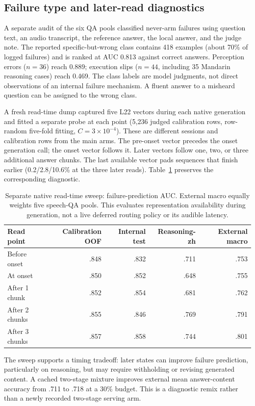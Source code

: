 \subsection{Failure type and later-read diagnostics}
\label{app:readtime}
A separate audit of the six QA pools classified never-arm failures
using question text, an audio transcript, the reference answer, the
local answer, and the judge note. The reported specific-but-wrong
class contains 418 examples (about 70\% of logged failures) and is
ranked at AUC 0.813 against correct answers. Perception errors
($n=36$) reach 0.889; execution slips ($n=44$, including 35 Mandarin
reasoning cases) reach 0.469. The class labels are model judgments,
not direct observations of an internal failure mechanism. A fluent
answer to a misheard question can be assigned to the wrong class.

A fresh read-time dump captured five L22 vectors during each native
generation and fitted a separate probe at each point (5,236 judged
calibration rows, row-random five-fold fitting, $C=3\times10^{-4}$).
These are different sessions and calibration rows from the main arms.
The pre-onset vector precedes the onset generation call; the onset
vector follows it. Later vectors follow one, two, or three additional
answer chunks. The last available vector pads sequences that finish
earlier (0.2/2.8/10.6\% at the three later reads).
Table~\ref{tab:readtime} preserves the corresponding diagnostic.

\begin{table}[h]
\centering\small
\caption{Separate native read-time sweep: failure-prediction AUC.
External macro equally weights five speech-QA pools. This evaluates
representation availability during generation, not a live deferred
routing policy or its audible latency.}
\label{tab:readtime}
\begin{tabular}{lrrrr}
\toprule
Read point & Calibration OOF & Internal test & Reasoning-zh & External macro\\
\midrule
Before onset & .848 & .832 & .711 & .753\\
At onset & .850 & .852 & .648 & .755\\
After 1 chunk & .852 & .854 & .681 & .762\\
After 2 chunks & .855 & .846 & .769 & .791\\
After 3 chunks & .857 & .858 & .744 & .801\\
\bottomrule
\end{tabular}
\end{table}

The sweep supports a timing tradeoff: later states can improve
failure prediction, particularly on reasoning, but may require
withholding or revising generated content. A cached two-stage
mixture improves external mean answer-content accuracy from .711
to .718 at a 30\% budget. This is a diagnostic remix rather than
a newly recorded two-stage serving arm.

